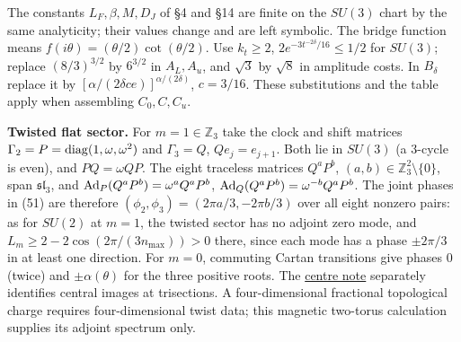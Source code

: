 \documentclass[11pt,a4paper]{article}
\begin{document}
The constants \(L_F,\beta,M,D_J\) of §4 and §14 are finite on the
\(SU(3)\) chart by the same analyticity; their values change and are
left symbolic. The bridge function means
\(f(i\theta)=(\theta/2)\cot(\theta/2)\). Use \(k_t\ge2\),
\(2e^{-3t^{-2\delta}/16}\le1/2\) for \(SU(3)\); replace \((8/3)^{3/2}\)
by \(6^{3/2}\) in \(A_L,A_u\), and \(\sqrt3\) by \(\sqrt8\) in amplitude
costs. In \(B_\delta\) replace it by
\([\alpha/(2\delta c e)]^{\alpha/(2\delta)}\), \(c=3/16\). These
substitutions and the table apply when assembling \(C_0,C,C_u\).

\textbf{Twisted flat sector.} For \(m=1\in\mathbb Z_3\) take the clock
and shift matrices \(\Gamma_2=P={\rm diag}(1,\omega,\omega^2)\) and
\(\Gamma_3=Q\), \(Qe_j=e_{j+1}\). Both lie in \(SU(3)\) (a 3-cycle is
even), and \(PQ=\omega QP\). The eight traceless matrices \(Q^aP^b\),
\((a,b)\in\mathbb Z_3^2\setminus\{0\}\), span \(\mathfrak{sl}_3\), and
\({\rm Ad}_P(Q^aP^b)=\omega^aQ^aP^b\),
\({\rm Ad}_Q(Q^aP^b)=\omega^{-b}Q^aP^b\). The joint phases in (51) are
therefore \((\phi_2,\phi_3)=(2\pi a/3,-2\pi b/3)\) over all eight
nonzero pairs: as for \(SU(2)\) at \(m=1\), the twisted sector has no
adjoint zero mode, and \(L_m\ge2-2\cos(2\pi/(3n_{\max}))>0\) there,
since each mode has a phase \(\pm2\pi/3\) in at least one direction. For
\(m=0\), commuting Cartan transitions give phases \(0\) (twice) and
\(\pm\alpha(\theta)\) for the three positive roots. The
\href{sun-midpoint-centre.md}{centre note} separately identifies central
images at trisections. A four-dimensional fractional topological charge
requires four-dimensional twist data; this magnetic two-torus
calculation supplies its adjoint spectrum only.
\end{document}

